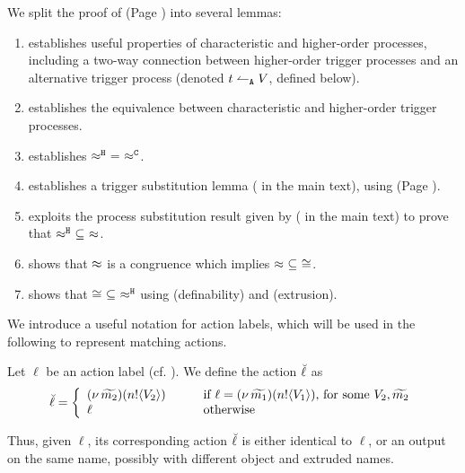 \noi We split the proof of  (Page \pageref{the:coincidence}) into 
several lemmas:
\begin{enumerate}[$-$]
\item {} 
establishes useful properties of characteristic and higher-order processes, including a two-way connection between 
higher-order trigger processes and an alternative trigger process
(denoted $t \leftharpoonup_\mathtt{A} V$, defined below).
\item {}
establishes the equivalence between characteristic and higher-order trigger processes. %
\item	{} establishes $\hwb\ =\ \fwb$.
\item    {} establishes a trigger substitution lemma ( in the main text), using 
 (Page \pageref{lem:trigger_application}).
\item	{} exploits the process substitution result
		given by  ( in the main text) to prove that $\hwb\ \subseteq\ \wbc$.
\item	{} shows that $\approx$ is a congruence
		which implies $\wbc\ \subseteq\ \cong$.
\item	{} shows  that $\cong\ \subseteq\ \hwb$ using 
 (definability) and  (extrusion).
\end{enumerate}


We introduce a useful notation for action labels, which will be used in the following to represent matching actions.

\begin{definition}
Let $\ell$ be an action label (cf. ). We define the action $\breve{\ell}$ as 
	\[
		\breve{\ell} =
		\left\{
		\begin{array}{lcl}
			(\nu\, \widetilde{m_2})(n ! \langle V_2 \rangle) & \quad & \text{if  $\ell = (\nu\, \widetilde{m_1})(n ! \langle V_1 \rangle)$, for some $V_2, \widetilde{m_2}$} 
			\\
			\ell &&  \text{otherwise}
		\end{array}
		\right.
	\]
\end{definition}

Thus, given $\ell$, its corresponding action $\breve{\ell}$ is either identical to $\ell$, or an output on the same name, possibly with different object and extruded names.


